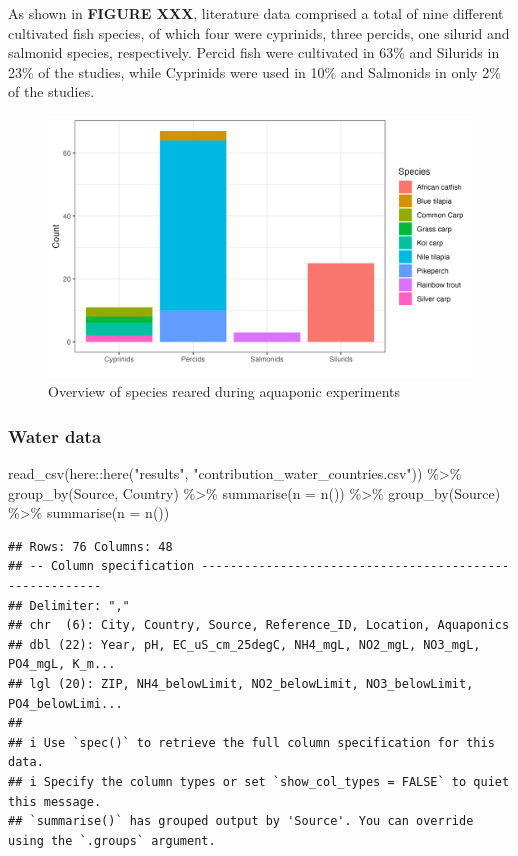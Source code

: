 \documentclass[
]{article}
\newenvironment{Shaded}{\begin{snugshade}}{\end{snugshade}}
\newcommand{\AttributeTok}[1]{\textcolor[rgb]{0.77,0.63,0.00}{#1}}
\newcommand{\FunctionTok}[1]{\textcolor[rgb]{0.00,0.00,0.00}{#1}}
\newcommand{\NormalTok}[1]{#1}
\newcommand{\SpecialCharTok}[1]{\textcolor[rgb]{0.00,0.00,0.00}{#1}}
\newcommand{\StringTok}[1]{\textcolor[rgb]{0.31,0.60,0.02}{#1}}
\begin{document}
As shown in \textbf{FIGURE XXX}, literature data comprised a total of nine different cultivated fish species, of which four were cyprinids, three percids, one silurid and salmonid species, respectively. Percid fish were cultivated in 63\% and Silurids in 23\% of the studies, while Cyprinids were used in 10\% and Salmonids in only 2\% of the studies.

\begin{figure}
\centering
\includegraphics{plots/species.png}
\caption{Overview of species reared during aquaponic experiments}
\end{figure}

\hypertarget{water-data}{%
\subsubsection{Water data}\label{water-data}}

\begin{Shaded}
\begin{Highlighting}[]
\FunctionTok{read\_csv}\NormalTok{(here}\SpecialCharTok{::}\FunctionTok{here}\NormalTok{(}\StringTok{"results"}\NormalTok{, }\StringTok{"contribution\_water\_countries.csv"}\NormalTok{)) }\SpecialCharTok{\%\textgreater{}\%} 
  \FunctionTok{group\_by}\NormalTok{(Source, Country) }\SpecialCharTok{\%\textgreater{}\%} 
  \FunctionTok{summarise}\NormalTok{(}\AttributeTok{n =} \FunctionTok{n}\NormalTok{()) }\SpecialCharTok{\%\textgreater{}\%} 
  \FunctionTok{group\_by}\NormalTok{(Source) }\SpecialCharTok{\%\textgreater{}\%} 
  \FunctionTok{summarise}\NormalTok{(}\AttributeTok{n =} \FunctionTok{n}\NormalTok{())}
\end{Highlighting}
\end{Shaded}

\begin{verbatim}
## Rows: 76 Columns: 48
## -- Column specification --------------------------------------------------------
## Delimiter: ","
## chr  (6): City, Country, Source, Reference_ID, Location, Aquaponics
## dbl (22): Year, pH, EC_uS_cm_25degC, NH4_mgL, NO2_mgL, NO3_mgL, PO4_mgL, K_m...
## lgl (20): ZIP, NH4_belowLimit, NO2_belowLimit, NO3_belowLimit, PO4_belowLimi...
## 
## i Use `spec()` to retrieve the full column specification for this data.
## i Specify the column types or set `show_col_types = FALSE` to quiet this message.
## `summarise()` has grouped output by 'Source'. You can override using the `.groups` argument.
\end{verbatim}
\end{document}
